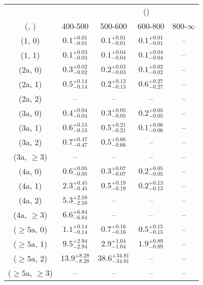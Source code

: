 \begin{table}[h!]
\tiny
\centering
{}
\begin{tabular}
{ccccc}
	\hline\hline
&	& \multicolumn{4}{c}{\scalht (\gev)} \\ 
	 (\njet,  \nb) & 400-500 & 500-600 & 600-800 & 800-$\infty$ \\ [0.8ex] 
\hline
	(1, 0) & $0.1^{+ 0.01 }_{- 0.01 }$ & $0.1^{+ 0.01 }_{- 0.01 }$ & $0.1^{+ 0.01 }_{- 0.01 }$ & -- \\[0.5ex] 
	(1, 1) & $0.1^{+ 0.03 }_{- 0.03 }$ & $0.1^{+ 0.04 }_{- 0.04 }$ & $0.1^{+ 0.04 }_{- 0.04 }$ & -- \\[0.5ex] 
	(2a, 0) & $0.3^{+ 0.02 }_{- 0.02 }$ & $0.2^{+ 0.03 }_{- 0.03 }$ & $0.1^{+ 0.02 }_{- 0.02 }$ & -- \\[0.5ex] 
	(2a, 1) & $0.5^{+ 0.14 }_{- 0.14 }$ & $0.2^{+ 0.13 }_{- 0.13 }$ & $0.6^{+ 0.27 }_{- 0.27 }$ & -- \\[0.5ex] 
	(2a, 2) & -- & -- & -- & -- \\[0.5ex] 
	(3a, 0) & $0.4^{+ 0.04 }_{- 0.04 }$ & $0.3^{+ 0.05 }_{- 0.05 }$ & $0.2^{+ 0.05 }_{- 0.05 }$ & -- \\[0.5ex] 
	(3a, 1) & $0.6^{+ 0.15 }_{- 0.15 }$ & $0.5^{+ 0.21 }_{- 0.21 }$ & $0.1^{+ 0.06 }_{- 0.06 }$ & -- \\[0.5ex] 
	(3a, 2) & $0.7^{+ 0.47 }_{- 0.47 }$ & $0.5^{+ 0.66 }_{- 0.66 }$ & -- & -- \\[0.5ex] 
	(3a, $\ge3$) & -- & -- & -- & -- \\[0.5ex] 
	(4a, 0) & $0.6^{+ 0.05 }_{- 0.05 }$ & $0.3^{+ 0.07 }_{- 0.07 }$ & $0.2^{+ 0.05 }_{- 0.05 }$ & -- \\[0.5ex] 
	(4a, 1) & $2.3^{+ 0.45 }_{- 0.45 }$ & $0.5^{+ 0.19 }_{- 0.19 }$ & $0.2^{+ 0.13 }_{- 0.13 }$ & -- \\[0.5ex] 
	(4a, 2) & $5.3^{+ 2.58 }_{- 2.58 }$ & -- & -- & -- \\[0.5ex] 
	(4a, $\ge3$) & $6.6^{+ 6.84 }_{- 6.84 }$ & -- & -- & -- \\[0.5ex] 
	($\ge5$a, 0) & $1.1^{+ 0.14 }_{- 0.14 }$ & $0.7^{+ 0.16 }_{- 0.16 }$ & $0.5^{+ 0.15 }_{- 0.15 }$ & -- \\[0.5ex] 
	($\ge5$a, 1) & $9.5^{+ 2.94 }_{- 2.94 }$ & $2.9^{+ 1.04 }_{- 1.04 }$ & $1.9^{+ 0.89 }_{- 0.89 }$ & -- \\[0.5ex] 
	($\ge5$a, 2) & $13.9^{+ 8.28 }_{- 8.28 }$ & $38.6^{+ 34.81 }_{- 34.81 }$ & -- & -- \\[0.5ex] 
	($\ge5$a, $\ge3$) & -- & -- & -- & -- \\[0.5ex] 
	\hline
	\hline
\end{tabular}
\end{table}
